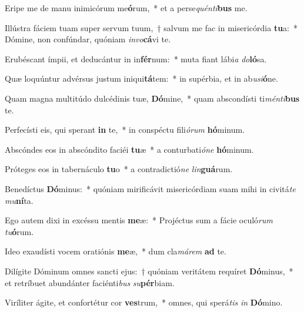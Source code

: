 \item Eripe me de manu inimicórum me\textbf{ó}rum,~* et a perse\textit{quén}\textit{ti}\textbf{bus} me.
\item Illústra fáciem tuam super servum tuum,~† salvum me fac in misericórdia \textbf{tu}a:~* Dómine, non confúndar, quóniam \textit{in}\textit{vo}\textbf{cá}vi te.
\item Erubéscant ímpii, et deducántur in in\textbf{fér}num:~* muta fiant lábi\textit{a} \textit{do}\textbf{ló}sa.
\item Quæ loquúntur advérsus justum iniqui\textbf{tá}tem:~* in supérbia, et in ab\textit{u}\textit{si}\textbf{ó}ne.
\item Quam magna multitúdo dulcédinis tuæ, \textbf{Dó}mine,~* quam abscondísti ti\textit{mén}\textit{ti}\textbf{bus} te.
\item Perfecísti eis, qui sperant \textbf{in} te,~* in conspéctu fili\textit{ó}\textit{rum} \textbf{hó}minum.
\item Abscóndes eos in abscóndito faciéi \textbf{tu}æ~* a conturbati\textit{ó}\textit{ne} \textbf{hó}minum.
\item Próteges eos in tabernáculo \textbf{tu}o~* a contradictió\textit{ne} \textit{lin}\textbf{guá}rum.
\item Benedíctus \textbf{Dó}minus:~* quóniam mirificávit misericórdiam suam mihi in civitá\textit{te} \textit{mu}\textbf{ní}ta.
\item Ego autem dixi in excéssu mentis \textbf{me}æ:~* Projéctus sum a fácie oculó\textit{rum} \textit{tu}\textbf{ó}rum.
\item Ideo exaudísti vocem oratiónis \textbf{me}æ,~* dum cla\textit{má}\textit{rem} \textbf{ad} te.
\item Dilígite Dóminum omnes sancti ejus:~† quóniam veritátem requíret \textbf{Dó}minus,~* et retríbuet abundánter faciénti\textit{bus} \textit{su}\textbf{pér}biam.
\item Viríliter ágite, et confortétur cor \textbf{ves}trum,~* omnes, qui sperá\textit{tis} \textit{in} \textbf{Dó}mino.
